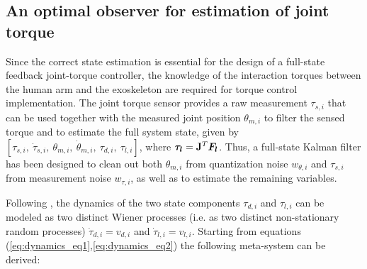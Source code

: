 \subsection{An optimal observer for estimation of joint torque}\label{subsec:kalmanTorque}
Since the correct state estimation  is essential for the design of a full-state feedback joint-torque controller, the knowledge of the interaction torques between the human arm and the exoskeleton are required for  torque control implementation. The joint torque sensor provides a raw measurement $\tau_{s,i}$ that can be used together with the measured joint position $\theta_{m,i}$ to filter the sensed torque and to estimate the full system state, given by $[\tau_{s,i},\ \dot{\tau}_{s,i},\ \theta_{m,i},\ \dot{\theta}_{m,i},\ \tau_{d,i},\ \tau_{l,i}]$, where ${ \boldsymbol {\tau_l}}=\mathbf{J}^T { \boldsymbol {F_l}}$. 
Thus, a full-state Kalman filter has been designed to clean out both  $\theta_{m,i}$ from quantization noise $w_{\theta,i}$ and $\tau_{s,i}$ from measurement noise $w_{\tau,i}$, as well as to estimate the remaining variables.
%
\par 
Following \cite{vertechy2012interaction}, the dynamics of the two state components $\tau_{d,i}$ and $\tau_{l,i}$ can be modeled as two distinct Wiener processes (i.e. as two distinct non-stationary random processes) $\dot{\tau}_{d,i}=v_{d,i}$ and $\dot{\tau}_{l,i}=v_{l,i}$. Starting from equations (\ref{eq:dynamics_eq1},\ref{eq:dynamics_eq2}) the following meta-system can be derived:
%



